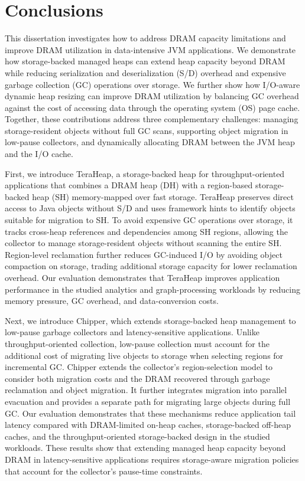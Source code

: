 \chapter{Conclusions}
\label{chapter:conclusion}

This dissertation investigates how to address DRAM capacity limitations and improve DRAM utilization in data-intensive JVM applications.
We demonstrate how storage-backed managed heaps can extend heap capacity beyond DRAM while reducing serialization and deserialization (S/D) overhead and expensive garbage collection (GC) operations over storage.
We further show how I/O-aware dynamic heap resizing can improve DRAM utilization by balancing GC overhead against the cost of accessing data through the operating system (OS) page cache.
Together, these contributions address three complementary challenges: managing storage-resident objects without full GC scans, supporting object migration in low-pause collectors, and dynamically allocating DRAM between the JVM heap and the I/O cache.

First, we introduce TeraHeap, a storage-backed heap for throughput-oriented applications that combines a DRAM heap (DH) with a region-based storage-backed heap (SH) memory-mapped over fast storage.
TeraHeap preserves direct access to Java objects without S/D and uses framework hints to identify objects suitable for migration to SH.
To avoid expensive GC operations over storage, it tracks cross-heap references and dependencies among SH regions, allowing the collector to manage storage-resident objects without scanning the entire SH.
Region-level reclamation further reduces GC-induced I/O by avoiding object compaction on storage, trading additional storage capacity for lower reclamation overhead.
Our evaluation demonstrates that TeraHeap improves application performance in the studied analytics and graph-processing workloads by reducing memory pressure, GC overhead, and data-conversion costs.

Next, we introduce Chipper, which extends storage-backed heap management to low-pause garbage collectors and latency-sensitive applications.
Unlike throughput-oriented collection, low-pause collection must account for the additional cost of migrating live objects to storage when selecting regions for incremental GC.
Chipper extends the collector's region-selection model to consider both migration costs and the DRAM recovered through garbage reclamation and object migration.
It further integrates migration into parallel evacuation and provides a separate path for migrating large objects during full GC.
Our evaluation demonstrates that these mechanisms reduce application tail latency compared with DRAM-limited on-heap caches, storage-backed off-heap caches, and the throughput-oriented storage-backed design in the studied workloads.
These results show that extending managed heap capacity beyond DRAM in latency-sensitive applications requires storage-aware migration policies that account for the collector's pause-time constraints.

